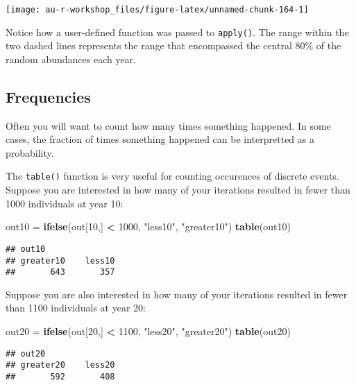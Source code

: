 \documentclass[]{book}
\newenvironment{Shaded}{\begin{snugshade}}{\end{snugshade}}
\newcommand{\KeywordTok}[1]{\textcolor[rgb]{0.13,0.29,0.53}{\textbf{#1}}}
\newcommand{\DecValTok}[1]{\textcolor[rgb]{0.00,0.00,0.81}{#1}}
\newcommand{\StringTok}[1]{\textcolor[rgb]{0.31,0.60,0.02}{#1}}
\newcommand{\OperatorTok}[1]{\textcolor[rgb]{0.81,0.36,0.00}{\textbf{#1}}}
\newcommand{\NormalTok}[1]{#1}
\theoremstyle{definition}
\theoremstyle{definition}
\theoremstyle{definition}
\theoremstyle{remark}
\begin{document}
\begin{center}\texttt{[image: au-r-workshop\_files/figure-latex/unnamed-chunk-164-1]} \end{center}

Notice how a user-defined function was passed to \texttt{apply()}. The
range within the two dashed lines represents the range that encompassed
the central 80\% of the random abundances each year.

\subsection{Frequencies}\label{frequencies}

Often you will want to count how many times something happened. In some
cases, the fraction of times something happened can be interpretted as a
probability.

The \texttt{table()} function is very useful for counting occurences of
discrete events. Suppose you are interested in how many of your
iterations resulted in fewer than 1000 individuals at year 10:

\begin{Shaded}
\begin{Highlighting}[]
\NormalTok{out10 =}\StringTok{ }\KeywordTok{ifelse}\NormalTok{(out[}\DecValTok{10}\NormalTok{,] }\OperatorTok{<}\StringTok{ }\DecValTok{1000}\NormalTok{, }\StringTok{"less10"}\NormalTok{, }\StringTok{"greater10"}\NormalTok{)}
\KeywordTok{table}\NormalTok{(out10)}
\end{Highlighting}
\end{Shaded}

\begin{verbatim}
## out10
## greater10    less10 
##       643       357
\end{verbatim}

Suppose you are also interested in how many of your iterations resulted
in fewer than 1100 individuals at year 20:

\begin{Shaded}
\begin{Highlighting}[]
\NormalTok{out20 =}\StringTok{ }\KeywordTok{ifelse}\NormalTok{(out[}\DecValTok{20}\NormalTok{,] }\OperatorTok{<}\StringTok{ }\DecValTok{1100}\NormalTok{, }\StringTok{"less20"}\NormalTok{, }\StringTok{"greater20"}\NormalTok{)}
\KeywordTok{table}\NormalTok{(out20)}
\end{Highlighting}
\end{Shaded}

\begin{verbatim}
## out20
## greater20    less20 
##       592       408
\end{verbatim}
\end{document}
